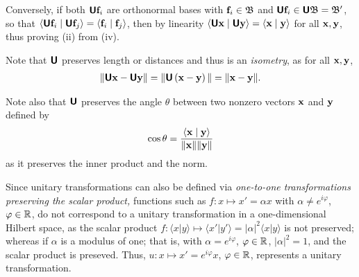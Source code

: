 {Conversely, if both $\textsf{\textbf{U}} {\bf f}_i$ are  orthonormal bases with ${\bf f}_i \in {\frak B}$
and  $\textsf{\textbf{U}}{\bf f}_i \in \textsf{\textbf{U}}{\frak B}= {\frak B}'$,
so that
$
\langle \textsf{\textbf{U}} {\bf f}_i \mid \textsf{\textbf{U}} {\bf f}_j \rangle
=
\langle {\bf f}_i \mid  {\bf f}_j \rangle$,
then by linearity
$
\langle \textsf{\textbf{U}} {\bf x} \mid \textsf{\textbf{U}} {\bf y} \rangle
=
\langle  {\bf x} \mid  {\bf y} \rangle $
for all ${\bf x},  {\bf y}$,
thus proving (ii) from (iv).



\eproof
}

Note that $\textsf{\textbf{U}}$ preserves length or distances and thus is an {\em isometry}, as for all ${\bf x}, {\bf y}$,
\begin{equation}
\begin{split}
\| \textsf{\textbf{U}}{\bf x} - \textsf{\textbf{U}}{\bf y} \| =
\| \textsf{\textbf{U}}\left( {\bf x} - {\bf y} \right) \| =
\|{\bf x}- {\bf y}\|
.
\end{split}
\label{2016-m-ch-uniteqpl}
\end{equation}

Note also that $\textsf{\textbf{U}}$ preserves the angle $\theta$ between two nonzero vectors ${\bf x}$ and ${\bf y}$  defined by
\begin{equation}
\begin{split}
\cos \theta = \frac{ \langle {\bf x} \mid {\bf y} \rangle } {\|{\bf x}\| \| {\bf y}\| }
\end{split}
\label{2016-m-ch-unitanglepres}
\end{equation}
as it preserves the inner product and the norm.

{\color{blue}
\bexample
Since unitary transformations can also be defined via {\em one-to-one transformations preserving the scalar product,}
functions such as
$f: x \mapsto x' =\alpha x$ with $\alpha \neq e^{i\varphi}$, $\varphi \in {\Bbb R}$,
do not correspond to a  unitary transformation in a one-dimensional Hilbert space, as
the scalar product $f:
\langle x \vert y \rangle
\mapsto
\langle x'\vert y'\rangle = \vert \alpha \vert^2 \langle x\vert y\rangle$
is not preserved; whereas if $\alpha$ is a modulus of one; that is,
with $\alpha = e^{i\varphi}$, $\varphi \in {\Bbb R}$,
$\vert \alpha \vert^2=1$, and the scalar product is preseved.
Thus, $u: x \mapsto x' =e^{i\varphi} x$, $\varphi \in {\Bbb R}$,
represents a unitary transformation.
\eexample
}




